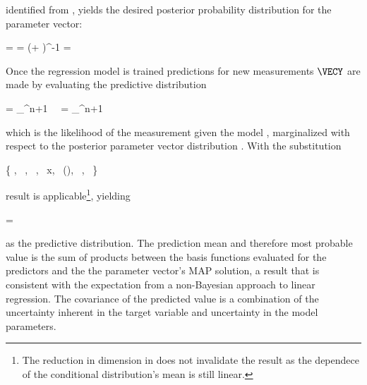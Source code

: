     identified from , yields the desired posterior
    probability distribution for the parameter vector:

    \placesubformula
    \startformula
    \startalign[n=2,align={right,left}]
        \NC \RPOSTERIOR = \NC \GAUSS{\VECW}{\MEANVEC}{\COVMAT} 
        \NC \COVMAT = \NC (\beta \MATPHIT \MATPHI + \alpha \MATID)^{-1} 
        \NC \MEANVEC = \NC \beta \COVMAT \MATPHIT \VECX \EQSTOP {}
    \stopalign
    \stopformula
    \stopsubformulas

    Once the regression model is trained predictions for new measurements
    $\VECY$ are made by evaluating the predictive distribution

    \startformula
    \startalign[n=2,align={right,left}]
        \NC \RPREDICT = \NC
            \int_{\REALS^{n+1}}  \,
            \RPOSTERIOR \, \diff \VECW \NR
        \NC = \NC
            \int_{\REALS^{n+1}}  \,
                \GAUSS{\VECW}{\MEANVEC}{\COVMAT} \,\diff \VECW \NR
    \stopalign
    \stopformula
    
    which is the likelihood of the measurement given the model
    , marginalized with respect to the posterior
    parameter vector distribution . With the
    substitution

    \startformula
        \{ \VECX \rightarrow \VECW,~
            \VECA \rightarrow \MEANVEC,~
            \MATP \rightarrow \COVMATI,~
            \VECY \rightarrow x,~
            \MATB \rightarrow \VECPHI(\VECY),~
            \VECB {},~
            \MATQ \rightarrow \beta \}
    \stopformula

    result  is applicable\footnote{The reduction in
    dimension in  does not invalidate the result as the
    dependece of the conditional distribution's mean is still linear.},
    yielding

    \startformula
        \RPREDICT = 
    \stopformula

    as the predictive distribution. The prediction mean and therefore most
    probable value is the sum of products between the basis functions evaluated
    for the predictors and the the parameter vector's MAP solution, a result
    that is consistent with the expectation from a non-Bayesian approach to
    linear regression. The covariance of the predicted value is a combination
    of the uncertainty inherent in the target variable and uncertainty in the
    model parameters.


